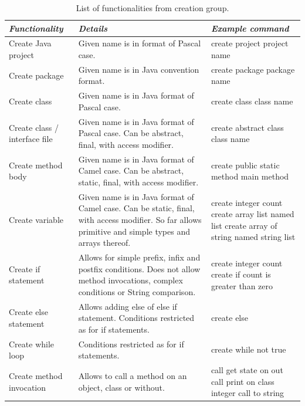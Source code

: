 \begin{table}[hbt!]
    \caption{List of functionalities from creation group.}
        \label{tab:creationFeatures}
        \centering
        \setlength{\textwidth}{5mm} %
        \def\arraystretch{1} %
        \begin{tabular}{|p{3cm}|p{}|p{4cm}|}
            \hline 
            \emph{Functionality} & \emph{Details} & \emph{Example command} \\
            \hline
            Create Java project & Given name is in format of Pascal case. & create project project name  \\
            \hline
            Create package & Given name is in Java  convention format. & create package package name  \\
            \hline
            Create class & Given name is in Java format of Pascal case. & create class class name  \\
            \hline
            Create class / interface file & Given name is in Java format of Pascal case. Can be abstract, final, with access modifier. & create abstract class class name  \\
            \hline
            Create method body & Given name is in Java format of Camel case. Can be abstract, static, final, with access modifier. & create public static method main method  \\
            \hline
            Create variable & Given name is in Java format of Camel case. Can be static, final, with access modifier. So far allows primitive and simple types and arrays thereof. & create integer count \newline create array list named list \newline create array of string named string list \\
            \hline
            Create if statement & Allows for simple prefix, infix and postfix conditions. Does not allow method invocations, complex conditions or String comparison. & create integer count \newline create if count is greater than zero\\
            \hline
            Create else statement & Allows adding else of else if statement. Conditions restricted as for if statements. & create else  \\
            \hline
            Create while loop & Conditions restricted as for if statements. & create while not true  \\
            \hline
            Create method invocation & Allows to call a method on an object, class or without. & call get state \newline on out call print \newline on class integer call to string\\
            \hline
        \end{tabular}
\end{table}

